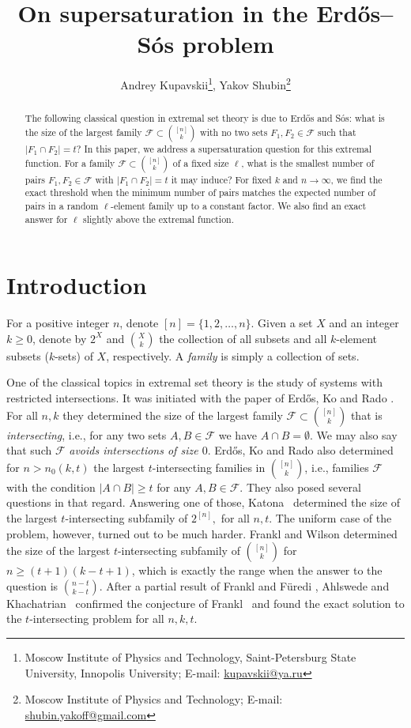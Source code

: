 \documentclass[12pt,a4paper]{article}
\title{On supersaturation in the Erd\H{o}s--S\'os problem}
\author{Andrey Kupavskii\thanks{Moscow Institute of Physics and Technology, Saint-Petersburg State University, Innopolis University;
E-mail: \url{kupavskii@ya.ru}}, Yakov Shubin\thanks{Moscow Institute of Physics and Technology;
E-mail: \url{shubin.yakoff@gmail.com}}}
\newcommand{\ff}{\mathcal{F}}
\begin{document}
\maketitle
\begin{abstract}
    The following classical question in extremal set theory is due to Erd\H os and S\'os: what is the size of the largest family $\ff\subset {[n]\choose k}$ with no two sets $F_1,F_2\in \ff$ such that $|F_1\cap F_2| = t$? In this paper, we address a supersaturation question for this extremal function. For a family $\ff\subset {[n]\choose k}$ of a fixed size $\ell$, what is the smallest number of pairs $F_1,F_2\in \ff$ with $|F_1\cap F_2|=t$ it may induce? For  fixed $k$ and $n\to \infty$, we find the exact threshold when the minimum number of pairs matches the expected number of pairs in a random $\ell$-element family up to a constant factor. We also find an exact answer for $\ell$ slightly above the extremal function. 
\end{abstract}
\section{Introduction}
For a positive integer $n$, denote $[n] = \{1,2,\ldots, n\}$. Given a set $X$ and an integer $k \geqslant 0$, denote by $2^X$ and $\binom{X}{k}$ the collection of all subsets and all $k$-element subsets ($k$-sets) of $X$, respectively. A {\it family} is simply a collection of sets. 

One of the classical topics in extremal set theory is the study of systems with restricted intersections. It was initiated with the paper of Erd\H os, Ko and Rado \cite{EKR}. For all $n,k$ they determined the size of the largest family $\ff\subset {[n]\choose k}$ that is {\it intersecting}, i.e., for any two sets $A,B\in \ff$ we have $A\cap B=\emptyset$.  We may also say that such $\ff$ {\it avoids intersections of size $0$}. Erd\H os, Ko and Rado also determined for $n>n_0(k,t)$ the largest $t$-intersecting families in ${[n]\choose k}$, i.e., families $\ff$ with the condition $|A\cap B|\ge t$ for any $A,B\in\ff$. They also posed several questions in that regard. Answering one of those, Katona~\cite{Kat} determined the size of the largest $t$-intersecting subfamily of $2^{[n]},$ for all $n,t.$ The uniform case of the problem, however, turned out to be much harder. Frankl \cite{F1} and Wilson \cite{W} determined the size of the largest $t$-intersecting subfamily of ${[n]\choose k}$ for $n\ge (t+1)(k-t+1)$, which is exactly the range when the answer to the question is ${n-t\choose k-t}.$ After a partial result of Frankl and F\"uredi \cite{FF0}, Ahlswede and Khachatrian~\cite{AK} confirmed the conjecture of Frankl~\cite{F1} and found the exact solution to the $t$-intersecting problem for all $n,k,t.$
\end{document}
